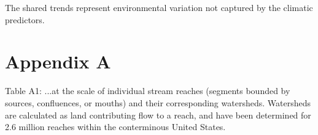 \documentclass{article}
\begin{document}
The shared trends represent environmental variation not captured by the climatic predictors. 

\section*{Appendix A}
Table A1:
...at the scale of individual stream reaches (segments bounded by sources, confluences, or mouths) and their corresponding watersheds. Watersheds are calculated as land contributing flow to a reach, and have been determined for 2.6 million reaches within the conterminous United States.
\end{document}
